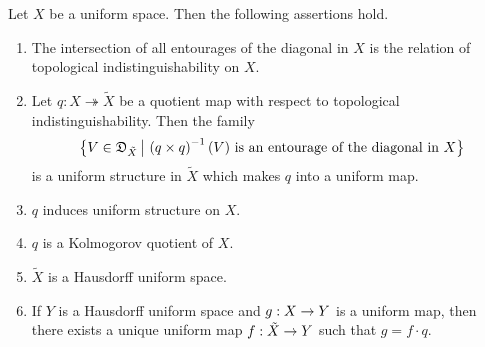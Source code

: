 \begin{theorem}\label{theorem:Kolmogorov_quotients_of_uniform_spaces}
	Let $X$ be a uniform space. Then the following assertions hold.
	\begin{enumerate}[label=\emph{\textbf{(\arabic*)}}, leftmargin=3.0em]
		\item The intersection of all entourages of the diagonal in $X$ is the relation of topological indistinguishability on $X$.
		\item Let $q:X\twoheadrightarrow \tilde{X}$ be a quotient map with respect to topological indistinguishability. Then the family
			$$\big\{V \in {\mathfrak D}_{\tilde{X}}\,\big|\,\left(q\times q\right)^{-1}(V)\mbox{ is an entourage of the diagonal in }X\big\}$$
		      is a uniform structure in $\tilde{X}$ which makes $q$ into a uniform map.
	        \item $q$ induces uniform structure on $X$. 
		\item $q$ is a Kolmogorov quotient of $X$.
	      \item $\tilde{X}$ is a Hausdorff uniform space.
		\item If $Y$ is a Hausdorff uniform space and $g:X\rightarrow Y$ is a uniform map, then there exists a unique uniform map $f:\tilde{X} \rightarrow Y$ such that $g = f \cdot q$.
	\end{enumerate}
\end{theorem}
